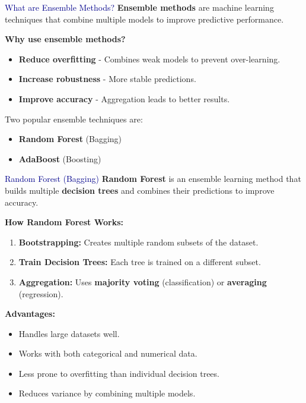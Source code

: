 \begin{frame}{\textcolor{darkblue}{What are Ensemble Methods?}}
    \textbf{Ensemble methods} are machine learning techniques that combine multiple models to improve predictive performance.

    \vspace{0.3cm}
    \textbf{Why use ensemble methods?}
    \begin{itemize}
        \item \textbf{Reduce overfitting} - Combines weak models to prevent over-learning.
        \item \textbf{Increase robustness} - More stable predictions.
        \item \textbf{Improve accuracy} - Aggregation leads to better results.
    \end{itemize}

    \vspace{0.3cm}
    Two popular ensemble techniques are:
    \begin{itemize}
        \item \textbf{Random Forest} (Bagging)
        \item \textbf{AdaBoost} (Boosting)
    \end{itemize}
\end{frame}

\begin{frame}{\textcolor{darkblue}{Random Forest (Bagging)}}
    \textbf{Random Forest} is an ensemble learning method that builds multiple \textbf{decision trees} and combines their predictions to improve accuracy.

    \vspace{0.3cm}
    \textbf{How Random Forest Works:}
    \begin{enumerate}
        \item \textbf{Bootstrapping:} Creates multiple random subsets of the dataset.
        \item \textbf{Train Decision Trees:} Each tree is trained on a different subset.
        \item \textbf{Aggregation:} Uses \textbf{majority voting} (classification) or \textbf{averaging} (regression).
    \end{enumerate}

    \vspace{0.3cm}
    \textbf{Advantages:}
    \begin{itemize}
        \item Handles large datasets well.
        \item Works with both categorical and numerical data.
        \item Less prone to overfitting than individual decision trees.
        \item Reduces variance by combining multiple models.
    \end{itemize}
\end{frame}

